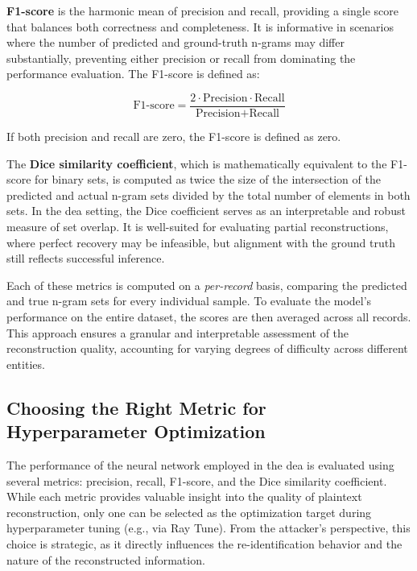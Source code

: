 \textbf{F1-score} is the harmonic mean of precision and recall, providing a single score that balances both correctness and completeness.
It is informative in scenarios where the number of predicted and ground-truth n-grams may differ substantially, preventing either precision or recall from dominating the performance evaluation.
The F1-score is defined as:

\[
\text{F1-score} = \frac{2 \cdot \text{Precision} \cdot \text{Recall}}{\text{Precision} + \text{Recall}}
\]

If both precision and recall are zero, the F1-score is defined as zero.

The \textbf{Dice similarity coefficient}, which is mathematically equivalent to the F1-score for binary sets, is computed as twice the size of the intersection of the predicted and actual n-gram sets divided by the total number of elements in both sets.
In the \ac{dea} setting, the Dice coefficient serves as an interpretable and robust measure of set overlap.
It is well-suited for evaluating partial reconstructions, where perfect recovery may be infeasible, but  alignment with the ground truth still reflects successful inference.

Each of these metrics is computed on a \emph{per-record} basis, comparing the predicted and true n-gram sets for every individual sample.
To evaluate the model's performance on the entire dataset, the scores are then averaged across all records.
This approach ensures a granular and interpretable assessment of the reconstruction quality, accounting for varying degrees of difficulty across different entities.

\subsection{Choosing the Right Metric for Hyperparameter Optimization} \label{sec:choosingmetric}


The performance of the neural network employed in the \ac{dea} is evaluated using several metrics: precision, recall, F1-score, and the Dice similarity coefficient.
While each metric provides valuable insight into the quality of plaintext reconstruction, only one can be selected as the optimization target during hyperparameter tuning (e.g., via Ray Tune).
From the attacker's perspective, this choice is strategic, as it directly influences the re-identification behavior and the nature of the reconstructed information.

